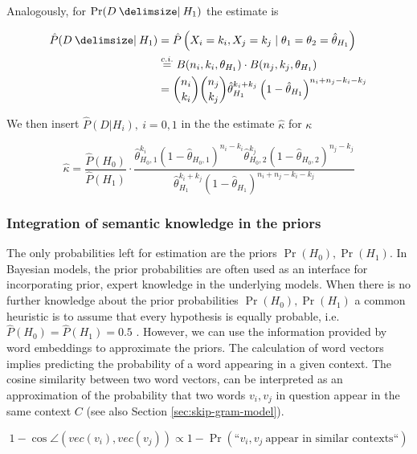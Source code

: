 Analogously, for $\Pr(D \given H_1)$ the estimate is 

\begin{equation}
\begin{split}
\hat{P}(D \given H_1) &= \hat{P}\left(X_i=k_i, X_j=k_j \mid \theta_1 = \theta_2 = \hat{\theta}_{H_1}\right) \\
					  &\stackrel{c.i.}{=} B(n_i,k_i,\theta_{H_1}) \cdot B(n_j,k_j,\theta_{H_1}) \\
					  &= \binom{n_i}{k_i}\binom{n_j}{k_j}\hat{\theta}_{H_1}^{k_i + k_j}\left(1-\hat{\theta}_{H_1}\right)^{n_i + n_j - k_i - k_j}
\end{split}
\end{equation}

We then insert $\hat{P}(D|H_i),~i=0,1$ in the the estimate $\hat{\kappa}$ for $\kappa$

\begin{equation}
\label{eq:bayes-factor}
\hat{\kappa} = \frac{\hat{P}(H_0)}{\hat{P}(H_1)} \cdot
\frac{\hat{\theta}_{H_0,1}^{k_i}\left(1-\hat{\theta}_{H_0,1}\right)^{n_i-k_i}\hat{\theta}_{H_0,2}^{k_j}\left(1-\hat{\theta}_{H_0,2}\right)^{n_j-k_j}
}{\hat{\theta}_{H_1}^{k_i + k_j}\left(1-\hat{\theta}_{H_1}\right)^{n_i +
n_j - k_i - k_j}}
\end{equation}

\subsubsection{Integration of semantic knowledge in the priors}
The only probabilities left for estimation are the priors $\Pr(H_0), \Pr(H_1)$.
In Bayesian models, the prior probabilities are often used as an interface for
incorporating prior, expert knowledge in the underlying models. When there is
no further knowledge about the prior probabilities $\Pr(H_0), \Pr(H_1)$ a common
heuristic is to assume that every hypothesis is equally probable, i.e. $\hat{P}(H_0) = \hat{P}(H_1) = 0.5$
\cite{zacks1971theory}. However, we can use the information provided by word 
embeddings to approximate the priors. The calculation of word
vectors implies predicting the probability of a word appearing in a given
context. The cosine similarity between two word vectors, can be interpreted as
an approximation of the probability that two words $v_i, v_j$ in question appear
in the same context $C$ \cite{mikolov2013distributed, mikolov2013efficient} (see also Section \ref{sec:skip-gram-model}). 

\begin{equation*}
	1 - \cos \angle (vec(v_i), vec(v_j)) \propto 1-\Pr(\text{``}v_i,
	v_j~\text{appear in similar contexts} \text{``})
\end{equation*}

